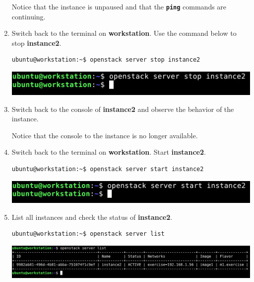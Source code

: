 \documentclass[letterpaper, 12pt]{article}
\begin{document}
\begin{enumerate}
    \begin{notebox}{}
        Notice that the instance is unpaused and that the \textbf{\texttt{ping}} commands are continuing.
    \end{notebox}

    \item Switch back to the terminal on \textbf{workstation}. Use the command below to stop \textbf{instance2}.
\begin{lstlisting}
ubuntu@workstation:~$ openstack server stop instance2
\end{lstlisting}

    \begin{center}
        \includegraphics[width=\linewidth]{images/part5/step15.png}
    \end{center}

    \item Switch back to the console of \textbf{instance2} and observe the behavior of the instance.
    
    \begin{notebox}{}
        Notice that the console to the instance is no longer available.        
    \end{notebox}

    \item Switch back to the terminal on \textbf{workstation}. Start \textbf{instance2}.
\begin{lstlisting}
ubuntu@workstation:~$ openstack server start instance2
\end{lstlisting}

    \begin{center}
        \includegraphics[width=\linewidth]{images/part5/step17.png}
    \end{center}

    \item List all instances and check the status of \textbf{instance2}.
\begin{lstlisting}
ubuntu@workstation:~$ openstack server list
\end{lstlisting}

    \begin{center}
        \includegraphics[width=\linewidth]{images/part5/step18.png}
    \end{center}


\end{enumerate}
\end{document}

